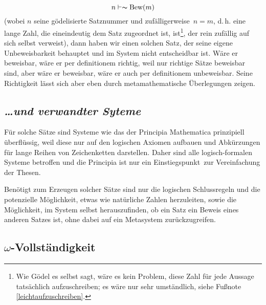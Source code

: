$$
n \vdash \thicksim \text{Bew}\left(m\right)
$$
(wobei $n$ seine gödelisierte Satznummer und \frq zufälligerweise\flq\ $n = m$, 
d.\,h. eine lange Zahl, die eineindeutig dem
Satz zugeordnet ist, ist\footnote{Wie Gödel es selbst sagt, wäre es kein Problem,
diese Zahl für jede Aussage tatsächlich aufzuschreiben; es wäre nur sehr umständlich, 
siehe Fußnote \ref{leichtaufzuschreiben}.}, der rein zufällig auf sich selbst verweist), 
dann haben wir einen solchen Satz, der seine eigene Unbeweisbarkeit
behauptet und im System nicht entscheidbar ist. Wäre er beweisbar, wäre er per definitionem
richtig, weil nur richtige Sätze beweisbar sind, aber wäre er beweisbar, wäre er auch 
per definitionem unbeweisbar. Seine Richtigkeit lässt sich aber eben durch
metamathematische Überlegungen zeigen.

\subsection*{\frq\textit{\dots und verwandter Syteme}\flq}

Für solche Sätze sind Systeme wie das der Principia Mathematica prinzipiell 
überflüssig,
weil diese nur auf den logischen Axiomen aufbauen und Abkürzungen für lange Reihen von
Zeichenketten darstellen. Daher sind alle logisch-formalen Systeme betroffen und die
Principia ist nur ein \frq Einstiegspunkt\flq\ zur Vereinfachung der Thesen.

Benötigt zum Erzeugen solcher Sätze sind nur die logischen Schlussregeln und die
potenzielle Möglichkeit, etwas wie natürliche Zahlen herzuleiten, sowie die Möglichkeit,
im System selbst herauszufinden, ob ein Satz ein Beweis eines anderen Satzes ist, ohne dabei
auf ein Metasystem zurückzugreifen.

\subsection*{$\omega$-Vollständigkeit}

